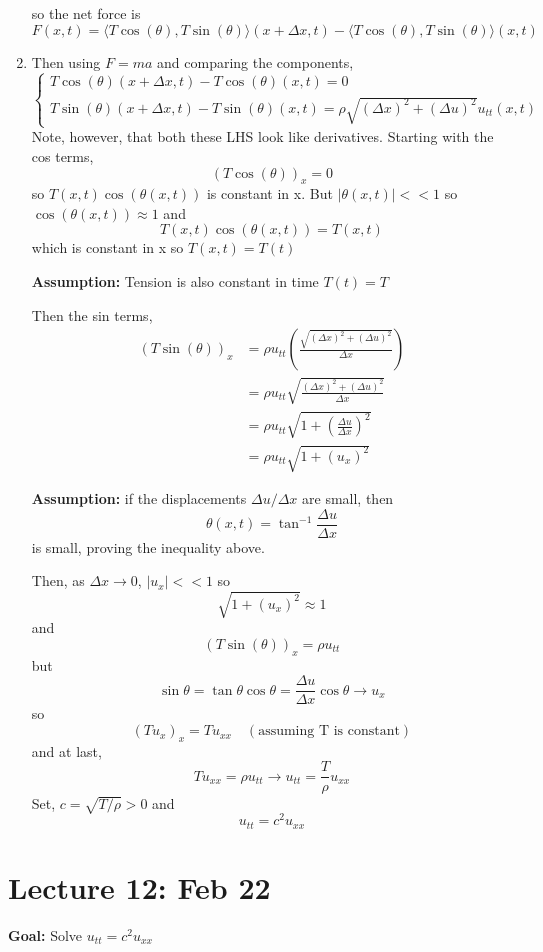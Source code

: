\documentclass[12pt]{article}
\newcommand{\brak}[1]{\langle #1 \rangle}
\begin{document}
\begin{enumerate}
    so the net force is 
    \[F(x, t) = \brak{T\cos(\theta), T\sin(\theta)}(x + \Delta x, t) - \brak{T\cos(\theta), T\sin(\theta)}(x, t)\]

    \item Then using $F = ma$ and comparing the components, 
    \[\begin{cases}
        T\cos(\theta)(x + \Delta x, t) - T\cos(\theta)(x, t) = 0\\
        T\sin(\theta)(x + \Delta x, t) - T\sin(\theta)(x, t) = \rho \sqrt{(\Delta x)^2 + (\Delta u)^2} u_{tt}(x, t)
    \end{cases}\]
    Note, however, that both these LHS look like derivatives. 
    Starting with the cos terms,
    \[(T\cos(\theta))_x = 0\]
    so $T(x, t)\cos(\theta(x, t))$ is constant in x. 
    But $|\theta(x, t)| << 1$ so $\cos(\theta(x, t)) \approx 1$ and 
    \[T(x, t) \cos(\theta(x, t)) = T(x, t)\]
    which is constant in x so $T(x, t) = T(t)$ 

    \textbf{Assumption:} Tension is also constant in time $T(t) = T$

    Then the sin terms, 
    \begin{align*}
        (T\sin(\theta))_x &= \rho u_{tt} \left(\frac{\sqrt{(\Delta x)^2 + (\Delta u)^2}}{\Delta x}\right)\\
        &= \rho u_{tt} \sqrt{\frac{(\Delta x)^2 + (\Delta u)^2}{\Delta x}} \\
        &= \rho u_{tt}  \sqrt{1 + \left(\frac{\Delta u}{\Delta x}\right)^2} \\
        &= \rho u_{tt} \sqrt{1 + (u_x)^2}
    \end{align*}

    \textbf{Assumption:} if the displacements $\Delta u/\Delta x$ are small, then 
    \[\theta(x, t) = \tan^{-1}\frac{\Delta u}{\Delta x}\]
    is small, proving the inequality above. 

    Then, as $\Delta x \to 0$, $|u_x| << 1$ so 
    \[\sqrt{1 + (u_x)^2} \approx 1\]
    and 
    \[(T\sin(\theta))_x = \rho u_{tt}\]
    but 
    \[\sin \theta  = \tan \theta \cos \theta = \frac{\Delta u}{\Delta x} \cos \theta \to u_x\]
    so 
    \[(Tu_x)_x = Tu_{xx} \quad (\text{assuming T is constant})\] 
    and at last, 
    \[Tu_{xx} = \rho u_{tt} \longrightarrow u_{tt} = \frac{T}{\rho}u_{xx}\]
    Set, $c = \sqrt{T / \rho} > 0$ and 
    \[\boxed{u_{tt} = c^2 u_{xx}}\]
\end{enumerate} 

\section{Lecture 12: Feb 22}
\textbf{Goal:} Solve $u_{tt} = c^2 u_{xx}$
\end{document}
